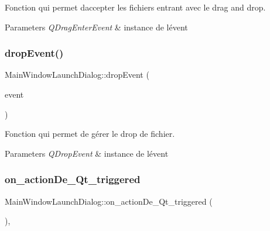 Fonction qui permet d\textquotesingle{}accepter les fichiers entrant avec le drag and drop. 


\begin{DoxyParams}{Parameters}
{\em Q\+Drag\+Enter\+Event} & instance de l\textquotesingle{}évent \\
\hline
\end{DoxyParams}
\mbox{\label{classMainWindowLaunchDialog_a6b292183d418fe79b79225d9a35bd3dd}} 
\subsubsection{\texorpdfstring{drop\+Event()}{dropEvent()}}
{\footnotesize\ttfamily Main\+Window\+Launch\+Dialog\+::drop\+Event (\begin{DoxyParamCaption}\item[{Q\+Drop\+Event $\ast$}]{event }\end{DoxyParamCaption})\hspace{0.3cm}{\ttfamily [private]}}



Fonction qui permet de gérer le drop de fichier. 


\begin{DoxyParams}{Parameters}
{\em Q\+Drop\+Event} & instance de l\textquotesingle{}évent \\
\hline
\end{DoxyParams}
\mbox{\label{classMainWindowLaunchDialog_a91bfa59302a3591b7b3b11b03d6f9b0e}} 
\subsubsection{\texorpdfstring{on\+\_\+action\+De\+\_\+\+Qt\+\_\+triggered}{on\_actionDe\_Qt\_triggered}}
{\footnotesize\ttfamily Main\+Window\+Launch\+Dialog\+::on\+\_\+action\+De\+\_\+\+Qt\+\_\+triggered (\begin{DoxyParamCaption}{ }\end{DoxyParamCaption})\hspace{0.3cm}{\ttfamily [private]}, {\ttfamily [slot]}}



